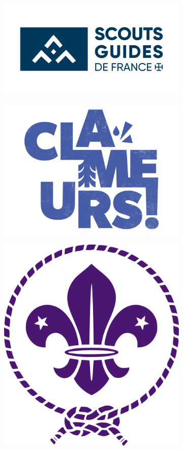 \documentclass[9pt]{article}
\begin{document}
\MultiwordChords


\begin{figure}[ht!]
     \centering
     \begin{subfigure}[b]{0.3\textwidth}
         \includegraphics[width=\textwidth]{images/SGDF_logo.png}%
         \hfill
     \end{subfigure}
     \hfill
     \begin{subfigure}[b]{0.3\textwidth}
     \centering
         \includegraphics[width=.7\textwidth]{images/logo-clameur.png}%
         \hfill
     \end{subfigure}
     \hfill
     \begin{subfigure}[b]{0.3\textwidth}
         \hfill%
         \includegraphics[width=.4\textwidth]{images/Scout_Logo.png}
     \end{subfigure}
\end{figure}
\end{document}
